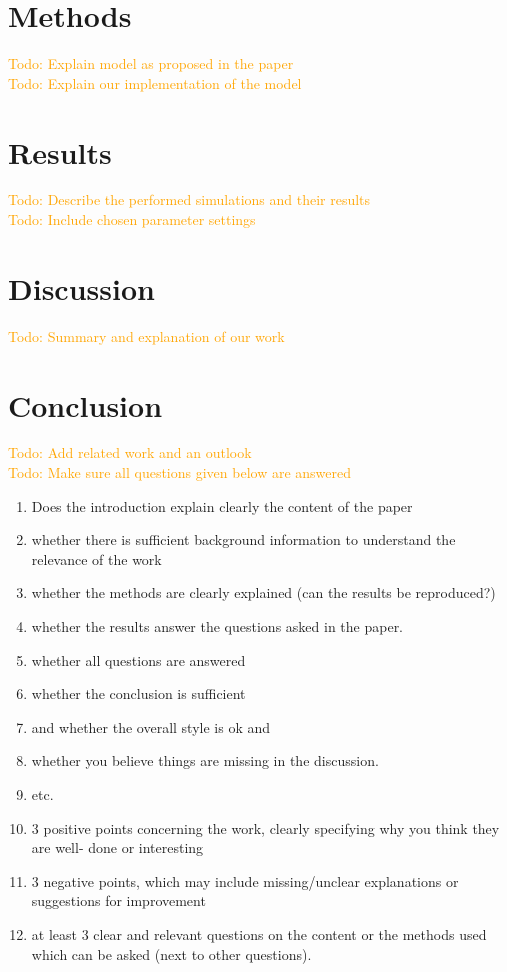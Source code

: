 \documentclass[letterpaper]{article}
\newcommand\todo[1]{\textcolor{orange}{Todo: #1}}
\begin{document}
\section{Methods}
\todo{Explain model as proposed in the paper}
\\\todo{Explain our implementation of the model}

\section{Results}
\todo{Describe the performed simulations and their results}
\\\todo{Include chosen parameter settings}

\section{Discussion}
\todo{Summary and explanation of our work}

\section{Conclusion}
\todo{Add related work and an outlook}
\\\todo{Make sure all questions given below are answered}
\begin{enumerate}
 \item Does the introduction explain clearly the content of the paper
 \item whether there is sufficient background information to understand the relevance of the work
 \item whether the methods are clearly explained (can the results be reproduced?)
 \item whether the results answer the questions asked in the paper.
 \item whether all questions are answered
 \item whether the conclusion is sufficient
 \item and whether the overall style is ok and
 \item whether you believe things are missing in the discussion.
 \item etc.
 \item 3 positive points concerning the work, clearly specifying why you think they are well-
       done or interesting
 \item 3 negative points, which may include missing/unclear explanations or suggestions for
       improvement
 \item at least 3 clear and relevant questions on the content or the methods used which can be asked (next to other questions).
\end{enumerate}
\end{document}
